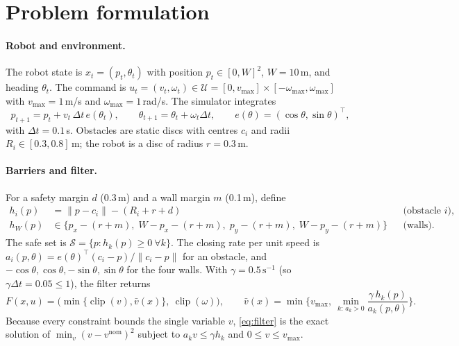 \documentclass[11pt]{article}
\theoremstyle{definition}
\theoremstyle{remark}
\begin{document}
\section{Problem formulation}\label{sec:problem}
\paragraph{Robot and environment.} The robot state is $x_t=(p_t,\theta_t)$ with position $p_t\in[0,W]^2$, $W=10$\,m, and heading $\theta_t$. The command is $u_t=(v_t,\omega_t)\in\mathcal U=[0,v_{\max}]\times[-\omega_{\max},\omega_{\max}]$ with $v_{\max}=1$\,m/s and $\omega_{\max}=1$\,rad/s. The simulator integrates
\begin{equation}\label{eq:dyn}
  p_{t+1}=p_t+v_t\,\Delta t\, e(\theta_t),\qquad \theta_{t+1}=\theta_t+\omega_t\Delta t,\qquad e(\theta)=(\cos\theta,\sin\theta)^\top,
\end{equation}
with $\Delta t=0.1$\,s. Obstacles are static discs with centres $c_i$ and radii $R_i\in[0.3,0.8]$\,m; the robot is a disc of radius $r=0.3$\,m.

\paragraph{Barriers and filter.} For a safety margin $d$ (0.3\,m) and a wall margin $m$ (0.1\,m), define
\begin{equation}\label{eq:barrier}
\begin{aligned}
  h_i(p)&=\lVert p-c_i\rVert-(R_i+r+d) &&\text{(obstacle $i$)},\\
  h_{W}(p)&\in\{p_x-(r+m),\;W-p_x-(r+m),\;p_y-(r+m),\;W-p_y-(r+m)\} &&\text{(walls)}.
\end{aligned}
\end{equation}
The safe set is $\mathcal S=\{p: h_k(p)\ge 0\ \forall k\}$. The closing rate per unit speed is $a_i(p,\theta)=e(\theta)^\top(c_i-p)/\lVert c_i-p\rVert$ for an obstacle, and $-\cos\theta,\cos\theta,-\sin\theta,\sin\theta$ for the four walls. With $\gamma=0.5\,\mathrm{s}^{-1}$ (so $\gamma\Delta t=0.05\le 1$), the filter returns
\begin{equation}\label{eq:filter}
  F(x,u)=\big(\min\{\operatorname{clip}(v),\bar v(x)\},\ \operatorname{clip}(\omega)\big),\qquad
  \bar v(x)=\min\Big\{v_{\max},\ \min_{k:\,a_k>0}\frac{\gamma\,h_k(p)}{a_k(p,\theta)}\Big\}.
\end{equation}
Because every constraint bounds the single variable $v$, \eqref{eq:filter} is the exact solution of $\min_{v}(v-v^{\mathrm{nom}})^2$ subject to $a_k v\le\gamma h_k$ and $0\le v\le v_{\max}$.
\end{document}

